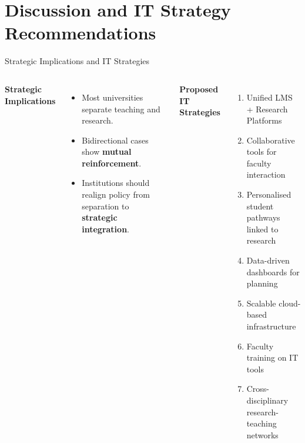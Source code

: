 \documentclass[aspectratio=169, table]{beamer}
\begin{document}

\section{Discussion and IT Strategy Recommendations}

\begin{frame}[fragile]{Strategic Implications and IT Strategies}
	\vspace{20pt}
	\begin{columns}[t]
		\textbf{Strategic Implications}
		\begin{itemize}
			\item Most universities separate teaching and research.
			\item Bidirectional cases show \textbf{mutual reinforcement}.
			\item Institutions should realign policy from separation to \textbf{strategic integration}.
		\end{itemize}
		
		\textbf{Proposed IT Strategies}
		\begin{enumerate}
			\item Unified LMS + Research Platforms
			\item Collaborative tools for faculty interaction
			\item Personalised student pathways linked to research
			\item Data-driven dashboards for planning
			\item Scalable cloud-based infrastructure
			\item Faculty training on IT tools
			\item Cross-disciplinary research-teaching networks
		\end{enumerate}
	\end{columns}
\end{frame}
\end{document}
